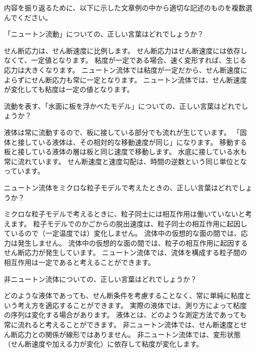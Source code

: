 \documentclass[uplatex,dvipdfmx,a4paper,11pt]{jsarticle}
\begin{document}
内容を振り返るために、以下に示した文章例の中から適切な記述のものを複数選んでください。
\begin{qlist}
	\qitem 「ニュートン流動」についての、正しい言葉はどれでしょうか？
		\begin{qlist2}
			\qitem せん断応力は、せん断速度に比例します。
			\qitem せん断応力はせん断速度には依存しなくて、一定値となります。
			\qitem 粘度が一定である場合、速く変形すれば、生じる応力は大きくなります。
			\qitem ニュートン流体では粘度が一定だから、せん断速度によらずにせん断応力も常に一定となります。
			\qitem ニュートン流体では、せん断速度が変化しても粘度は一定の値となります。
		\end{qlist2}
		\vspace{3mm}
        
	\qitem 流動を表す、「水面に板を浮かべたモデル」についての、正しい言葉はどれでしょうか？
		\begin{qlist2}
			\qitem 液体は常に流動するので、板に接している部分でも流れが生じています。
			\qitem 「固体と接している液体は、その相対的な移動速度が同じ」になります。
			\qitem 移動する板と接している液体の層は板と同じ速度で移動します。
			\qitem 水底に接している水も常に流れています。
			\qitem せん断速度と速度勾配は、時間の逆数という同じ単位となっています。
		\end{qlist2}
		\vspace{3mm}
        
		\qitem ニュートン流体をミクロな粒子モデルで考えたときの、正しい言葉はどれでしょうか？
		\begin{qlist2}
			\qitem ミクロな粒子モデルで考えるときに、粒子同士には相互作用は働いていないと考えます。
			\qitem 粒子モデルでのかごからの脱出速度は、粒子同士の相互作用に起因しているので（一定温度では）変化しません。
			\qitem 流体中の仮想的な面の間では、応力は発生しません。
			\qitem 流体中の仮想的な面の間では、粒子の相互作用に起因するせん断応力が発生しています。
			\qitem ニュートン流体では、流体を構成する粒子間の相互作用は一定であると考えることができます。
		\end{qlist2}
		\vspace{3mm}
        
		\qitem 非ニュートン流体についての、正しい言葉はどれでしょうか？
		\begin{qlist2}
			\qitem どのような液体であっても、せん断条件を考慮することなく、常に単純に粘度という考え方を適応することができます。
			\qitem 実際の液体では、測り方によって粘度の序列は変化する場合があります。
			\qitem 液体とは、どのような測定方法であっても常に流れると考えることができます。
			\qitem 非ニュートン流体では、せん断速度とせん断応力との関係が線形ではありません。
			\qitem 非ニュートン流体では、変形状態（せん断速度や加える力が変化）に依存して粘度が変化します。
		\end{qlist2}
		\vspace{3mm}
        

\end{qlist}
\end{document}
